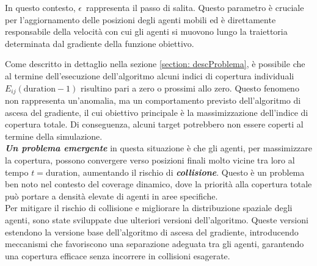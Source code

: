 \documentclass[twoside]{article}
\begin{document}
\vspace{\baselineskip}

\begin{algorithm}[H]
\SetAlgoLined
{}
\caption{V1: Algoritmo di coverage dinamico con ascesa del gradiente}
\end{algorithm}

\vspace{\baselineskip}

In questo contesto, $\epsilon$\ rappresenta il passo di salita. Questo parametro è cruciale per l'aggiornamento delle posizioni degli agenti mobili ed è direttamente responsabile della velocità con cui gli agenti si muovono lungo la traiettoria determinata dal gradiente della funzione obiettivo.

\vspace{\baselineskip}
Come descritto in dettaglio nella sezione \ref{section: descProblema}, è possibile che al termine dell'esecuzione dell'algoritmo alcuni indici di copertura individuali \ensuremath{E_{ij}(\text{duration}-1)} risultino pari a zero o prossimi allo zero. Questo fenomeno non rappresenta un'anomalia, ma un comportamento previsto dell'algoritmo di ascesa del gradiente, il cui obiettivo principale è la massimizzazione dell'indice di copertura totale. Di conseguenza, alcuni target potrebbero non essere coperti al termine della simulazione.\\

\textit{\textbf{Un problema emergente}} in questa situazione è che gli agenti, per massimizzare la copertura, possono convergere verso posizioni finali molto vicine tra loro al tempo \( t = \text{duration} \), aumentando il rischio di \textit{\textbf{collisione}}. Questo è un problema ben noto nel contesto del coverage dinamico, dove la priorità alla copertura totale può portare a densità elevate di agenti in aree specifiche.\\

Per mitigare il rischio di collisione e migliorare la distribuzione spaziale degli agenti, sono state sviluppate due ulteriori versioni dell'algoritmo. Queste versioni estendono la versione base dell'algoritmo di ascesa del gradiente, introducendo meccanismi che favoriscono una separazione adeguata tra gli agenti, garantendo una copertura efficace senza incorrere in collisioni esagerate.\\
\end{document}
